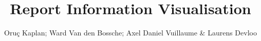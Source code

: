 \documentclass{article}
\begin{document}
	\title{Report Information Visualisation}
	\author{Oruç Kaplan; Ward Van den Bossche; Axel Daniel Vuillaume \& Laurens Devloo}
	\maketitle
	\tableofcontents
	\newpage
	
	
	
	\newpage
\end{document}
